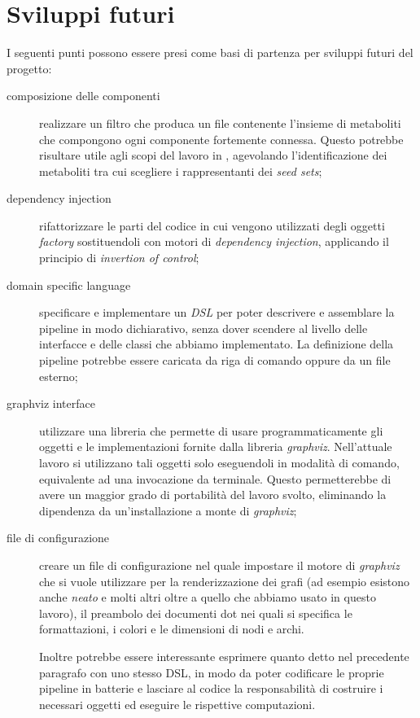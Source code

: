 \section{Sviluppi futuri}

I seguenti punti possono essere presi come basi di partenza per
sviluppi futuri del progetto:
\begin{description}
\item[composizione delle componenti] realizzare un filtro che produca
  un file contenente l'insieme di metaboliti che compongono ogni
  componente fortemente connessa. Questo potrebbe risultare utile agli
  scopi del lavoro in \cite{large-scale-reconstruction}, agevolando
  l'identificazione dei metaboliti tra cui scegliere i rappresentanti
  dei \emph{seed sets};
\item[dependency injection] rifattorizzare le parti del codice in cui
  vengono utilizzati degli oggetti \emph{factory} sostituendoli con
  motori di \emph{dependency injection}, applicando il principio di
  \emph{invertion of control};
\item[domain specific language] specificare e implementare un
  \emph{DSL} per poter descrivere e assemblare la pipeline in modo
  dichiarativo, senza dover scendere al livello delle interfacce e
  delle classi che abbiamo implementato. La definizione della pipeline
  potrebbe essere caricata da riga di comando oppure da un file
  esterno;
\item[graphviz interface] utilizzare una libreria che permette di
  usare programmaticamente gli oggetti e le implementazioni fornite
  dalla libreria \emph{graphviz}. Nell'attuale lavoro si utilizzano
  tali oggetti solo eseguendoli in modalit\`a di comando, equivalente
  ad una invocazione da terminale. Questo permetterebbe di avere un
  maggior grado di portabilit\`a del lavoro svolto, eliminando la
  dipendenza da un'installazione a monte di \emph{graphviz};
\item[file di configurazione] creare un file di configurazione nel
  quale impostare il motore di \emph{graphviz} che si vuole utilizzare
  per la renderizzazione dei grafi (ad esempio esistono anche
  \emph{neato} e molti altri oltre a quello che abbiamo usato in
  questo lavoro), il preambolo dei documenti dot nei quali si
  specifica le formattazioni, i colori e le dimensioni di nodi e
  archi.

  Inoltre potrebbe essere interessante esprimere quanto detto nel
  precedente paragrafo con uno stesso DSL, in modo da poter codificare
  le proprie pipeline in batterie e lasciare al codice la
  responsabilit\`a di costruire i necessari oggetti ed eseguire le
  rispettive computazioni.


\end{description}

